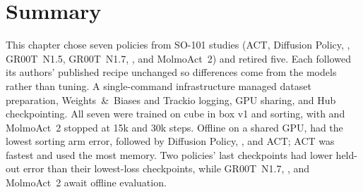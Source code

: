 \section{Summary}
This chapter chose seven policies from SO-101 studies (ACT, Diffusion Policy, \smolvla{}, GR00T~N1.5, GR00T~N1.7, \pizerofive{}, and MolmoAct~2) and retired five. Each followed its authors' published recipe unchanged so differences come from the models rather than tuning. A single-command infrastructure managed dataset preparation, Weights~\&~Biases and Trackio logging, GPU sharing, and Hub checkpointing. All seven were trained on cube in box v1 and sorting, with \pizerofive{} and MolmoAct~2 stopped at 15k and 30k steps. Offline on a shared GPU, \smolvla{} had the lowest sorting arm error, followed by Diffusion Policy, \groot{}, and ACT; ACT was fastest and \groot{} used the most memory. Two policies' last checkpoints had lower held-out error than their lowest-loss checkpoints, while GR00T~N1.7, \pizerofive{}, and MolmoAct~2 await offline evaluation.
